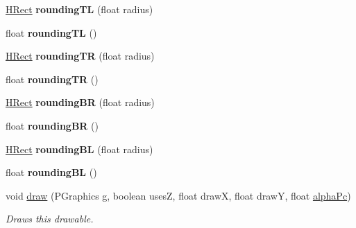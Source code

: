 \begin{DoxyCompactItemize}
\item 
\hypertarget{classhype_1_1extended_1_1drawable_1_1_h_rect_a3dbebef6e54ba3c87be895d9e47fd8c4}{\hyperlink{classhype_1_1extended_1_1drawable_1_1_h_rect}{H\-Rect} {\bfseries rounding\-T\-L} (float radius)}\label{classhype_1_1extended_1_1drawable_1_1_h_rect_a3dbebef6e54ba3c87be895d9e47fd8c4}

\item 
\hypertarget{classhype_1_1extended_1_1drawable_1_1_h_rect_ac949ee8c38d5f35d3f440ea000406632}{float {\bfseries rounding\-T\-L} ()}\label{classhype_1_1extended_1_1drawable_1_1_h_rect_ac949ee8c38d5f35d3f440ea000406632}

\item 
\hypertarget{classhype_1_1extended_1_1drawable_1_1_h_rect_aee3e7b8de8f70b3476ec0257312e8e35}{\hyperlink{classhype_1_1extended_1_1drawable_1_1_h_rect}{H\-Rect} {\bfseries rounding\-T\-R} (float radius)}\label{classhype_1_1extended_1_1drawable_1_1_h_rect_aee3e7b8de8f70b3476ec0257312e8e35}

\item 
\hypertarget{classhype_1_1extended_1_1drawable_1_1_h_rect_a4512a97bf07ae5d008c00274dea1a8b0}{float {\bfseries rounding\-T\-R} ()}\label{classhype_1_1extended_1_1drawable_1_1_h_rect_a4512a97bf07ae5d008c00274dea1a8b0}

\item 
\hypertarget{classhype_1_1extended_1_1drawable_1_1_h_rect_a403cf9af3529a2251f9ac9316a668bab}{\hyperlink{classhype_1_1extended_1_1drawable_1_1_h_rect}{H\-Rect} {\bfseries rounding\-B\-R} (float radius)}\label{classhype_1_1extended_1_1drawable_1_1_h_rect_a403cf9af3529a2251f9ac9316a668bab}

\item 
\hypertarget{classhype_1_1extended_1_1drawable_1_1_h_rect_a37d0e960c8120b72a489c10659671a3b}{float {\bfseries rounding\-B\-R} ()}\label{classhype_1_1extended_1_1drawable_1_1_h_rect_a37d0e960c8120b72a489c10659671a3b}

\item 
\hypertarget{classhype_1_1extended_1_1drawable_1_1_h_rect_ad66438698f1bd3a33b214f3041c979b3}{\hyperlink{classhype_1_1extended_1_1drawable_1_1_h_rect}{H\-Rect} {\bfseries rounding\-B\-L} (float radius)}\label{classhype_1_1extended_1_1drawable_1_1_h_rect_ad66438698f1bd3a33b214f3041c979b3}

\item 
\hypertarget{classhype_1_1extended_1_1drawable_1_1_h_rect_acfddc39e1df383904a9c15317dae6d07}{float {\bfseries rounding\-B\-L} ()}\label{classhype_1_1extended_1_1drawable_1_1_h_rect_acfddc39e1df383904a9c15317dae6d07}

\item 
void \hyperlink{classhype_1_1extended_1_1drawable_1_1_h_rect_ac616395ca715c8fb6dddf74b203df51d}{draw} (P\-Graphics g, boolean uses\-Z, float draw\-X, float draw\-Y, float \hyperlink{classhype_1_1core_1_1drawable_1_1_h_drawable_ab71ad420ba6d4a5eb981296684033d74}{alpha\-Pc})
\begin{DoxyCompactList}\small\item\em Draws this drawable. \end{DoxyCompactList}\end{DoxyCompactItemize}

